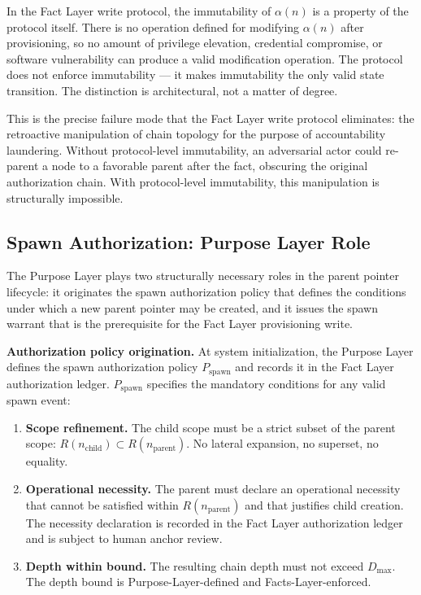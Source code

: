 In the Fact Layer write protocol, the immutability of $\alpha(n)$ is a property of the protocol itself. There is no operation defined for modifying $\alpha(n)$ after provisioning, so no amount of privilege elevation, credential compromise, or software vulnerability can produce a valid modification operation. The protocol does not enforce immutability --- it makes immutability the only valid state transition. The distinction is architectural, not a matter of degree.

This is the precise failure mode that the Fact Layer write protocol eliminates: the retroactive manipulation of chain topology for the purpose of accountability laundering. Without protocol-level immutability, an adversarial actor could re-parent a node to a favorable parent after the fact, obscuring the original authorization chain. With protocol-level immutability, this manipulation is structurally impossible.

\subsection{Spawn Authorization: Purpose Layer Role}
\label{sec:purpose-layer-spawn-authorization}

The Purpose Layer plays two structurally necessary roles in the parent pointer lifecycle: it originates the spawn authorization policy that defines the conditions under which a new parent pointer may be created, and it issues the spawn warrant that is the prerequisite for the Fact Layer provisioning write.

\medskip
\noindent\textbf{Authorization policy origination.} At system initialization, the Purpose Layer defines the spawn authorization policy $P_{\mathrm{spawn}}$ and records it in the Fact Layer authorization ledger. $P_{\mathrm{spawn}}$ specifies the mandatory conditions for any valid spawn event:

\begin{enumerate}
    \item[(S1)] \textbf{Scope refinement.} The child scope must be a strict subset of the parent scope: $R(n_{\mathrm{child}}) \subset R(n_{\mathrm{parent}})$. No lateral expansion, no superset, no equality.
    \item[(S2)] \textbf{Operational necessity.} The parent must declare an operational necessity that cannot be satisfied within $R(n_{\mathrm{parent}})$ and that justifies child creation. The necessity declaration is recorded in the Fact Layer authorization ledger and is subject to human anchor review.
    \item[(S3)] \textbf{Depth within bound.} The resulting chain depth must not exceed $D_{\max}$. The depth bound is Purpose-Layer-defined and Facts-Layer-enforced.
\end{enumerate}

